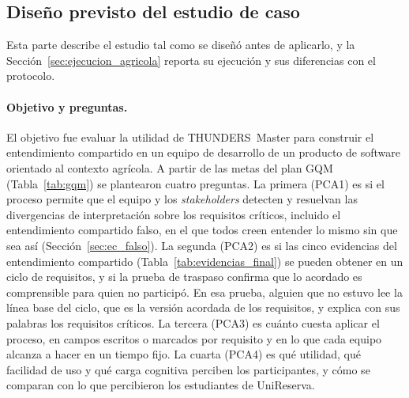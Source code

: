 \documentclass[12pt,letterpaper,oneside]{report}
\begin{document}
\subsection{Diseño previsto del estudio de caso}
Esta parte describe el estudio tal como se diseñó antes de aplicarlo, y la
Sección~\ref{sec:ejecucion_agricola} reporta su ejecución y sus diferencias con
el protocolo.

\paragraph{Objetivo y preguntas.}
El objetivo fue evaluar la utilidad de THUNDERS~Master para construir el
entendimiento compartido en un equipo de desarrollo de un producto de software
orientado al contexto agrícola. A partir de las metas del plan GQM
(Tabla~\ref{tab:gqm}) se plantearon cuatro preguntas. La primera (PCA1) es si el
proceso permite que el equipo y los \textit{stakeholders} detecten y resuelvan
las divergencias de interpretación sobre los requisitos críticos, incluido el
entendimiento compartido falso, en el que todos creen entender lo mismo sin que
sea así (Sección~\ref{sec:ec_falso}). La segunda (PCA2) es si las cinco
evidencias del entendimiento compartido (Tabla~\ref{tab:evidencias_final}) se
pueden obtener en un ciclo de requisitos, y si la prueba de traspaso confirma
que lo acordado es comprensible para quien no participó. En esa prueba, alguien
que no estuvo lee la línea base del ciclo, que es la versión acordada de los
requisitos, y explica con sus palabras los requisitos críticos. La tercera
(PCA3) es cuánto cuesta aplicar el proceso, en campos escritos o marcados por
requisito y en lo que cada equipo alcanza a hacer en un tiempo fijo. La cuarta
(PCA4) es qué utilidad, qué facilidad de uso y qué carga cognitiva perciben los
participantes, y cómo se comparan con lo que percibieron los estudiantes de
UniReserva.
\end{document}
